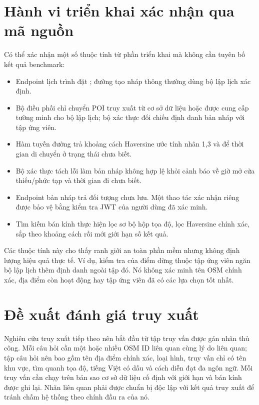\section{Hành vi triển khai xác nhận qua mã nguồn}

Có thể xác nhận một số thuộc tính từ phần triển khai mà không cần tuyên bố kết quả benchmark:
\begin{itemize}[leftmargin=1.8em,itemsep=3pt]
    \item Endpoint lịch trình đặt ; đường tạo nháp thông thường dùng bộ lập lịch xác định.
    \item Bộ điều phối chỉ chuyển POI truy xuất từ cơ sở dữ liệu hoặc được cung cấp tường minh cho bộ lập lịch; bộ xác thực đối chiếu định danh bản nháp với tập ứng viên.
    \item Hàm tuyến đường trả khoảng cách Haversine ước tính nhân 1,3 và để thời gian di chuyển ở trạng thái chưa biết.
    \item Bộ xác thực tách lỗi làm bản nháp không hợp lệ khỏi cảnh báo về giờ mở cửa thiếu/phức tạp và thời gian đi chưa biết.
    \item Endpoint bản nháp trả đối tượng chưa lưu. Một thao tác xác nhận riêng được bảo vệ bằng kiểm tra JWT của người dùng đã xác minh.
    \item Tìm kiếm bán kính thực hiện lọc sơ bộ hộp tọa độ, lọc Haversine chính xác, sắp theo khoảng cách rồi mới giới hạn số kết quả.
\end{itemize}

Các thuộc tính này cho thấy ranh giới an toàn phần mềm nhưng không định lượng hiệu quả thực tế. Ví dụ, kiểm tra  của điểm dừng thuộc tập ứng viên ngăn bộ lập lịch thêm định danh ngoài tập đó. Nó không xác minh tên OSM chính xác, địa điểm còn hoạt động hay tập ứng viên đã có các lựa chọn tốt nhất.

\section{Đề xuất đánh giá truy xuất}

Nghiên cứu truy xuất tiếp theo nên bắt đầu từ tập truy vấn được gán nhãn thủ công. Mỗi câu hỏi cần một hoặc nhiều OSM ID liên quan cùng lý do liên quan; tập câu hỏi nên bao gồm tên địa điểm chính xác, loại hình, truy vấn chỉ có tên khu vực, tìm quanh tọa độ, tiếng Việt có dấu và cách diễn đạt đa ngôn ngữ. Mỗi truy vấn cần chạy trên bản sao cơ sở dữ liệu cố định với giới hạn và bán kính được ghi lại. Nhãn liên quan phải được chuẩn bị độc lập với kết quả truy xuất để tránh chấm hệ thống theo chính đầu ra của nó.

